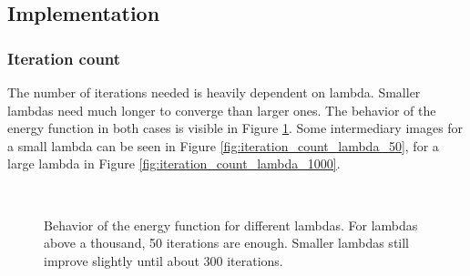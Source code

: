 \documentclass{paper}
\begin{document}
\subsection*{Implementation}

\subsubsection*{Iteration count}
The number of iterations needed is heavily dependent on lambda. 
Smaller lambdas need much longer to converge than larger ones. 
The behavior of the energy function in both cases is visible in Figure \ref{fig:energy_plots}. 
Some intermediary images for a small lambda can be seen in Figure \ref{fig:iteration_count_lambda_50}, for a large lambda in Figure \ref{fig:iteration_count_lambda_1000}.
\begin{figure}[ht!]%
\centering
{}
 \\
\caption{Behavior of the energy function for different lambdas. For lambdas above 
a thousand, 50 iterations are enough. Smaller lambdas still improve slightly until about 300 iterations.}
\label{fig:energy_plots}
\end{figure}
\end{document}
